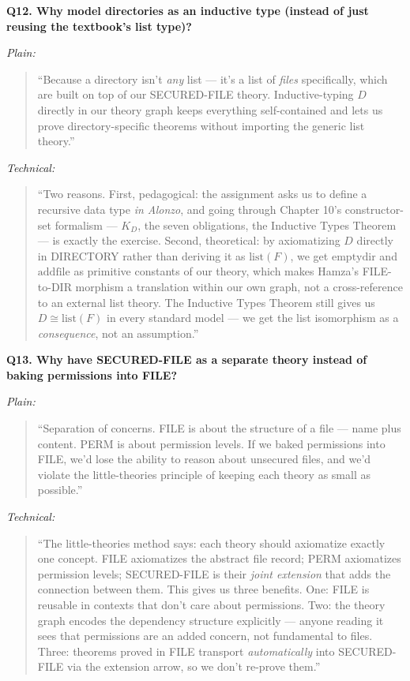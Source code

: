 \documentclass[12pt]{article}
\newenvironment{say}{%
  \par\medskip%
  \begin{quote}%
  \setlength{\parskip}{0.7em}%
  \large\itshape%
}{%
  \end{quote}%
  \medskip%
}
\begin{document}
\vspace{0.8em}
\textbf{\color{slidebar}Q12. Why model directories as an inductive type (instead of just reusing the textbook's list type)?}

\textit{\color{pauseclr}Plain:}
\begin{say}
``Because a directory isn't \emph{any} list --- it's a list of \emph{files} specifically, which are built on top of our SECURED-FILE theory. Inductive-typing $D$ directly in our theory graph keeps everything self-contained and lets us prove directory-specific theorems without importing the generic list theory.''
\end{say}

\textit{\color{pauseclr}Technical:}
\begin{say}
``Two reasons. First, pedagogical: the assignment asks us to define a recursive data type \emph{in Alonzo}, and going through Chapter 10's constructor-set formalism --- $K_D$, the seven obligations, the Inductive Types Theorem --- is exactly the exercise. Second, theoretical: by axiomatizing $D$ directly in DIRECTORY rather than deriving it as $\mathrm{list}(F)$, we get $\mathrm{emptydir}$ and $\mathrm{addfile}$ as primitive constants of our theory, which makes Hamza's FILE-to-DIR morphism a translation within our own graph, not a cross-reference to an external list theory. The Inductive Types Theorem still gives us $D \cong \mathrm{list}(F)$ in every standard model --- we get the list isomorphism as a \emph{consequence}, not an assumption.''
\end{say}

\vspace{0.8em}
\textbf{\color{slidebar}Q13. Why have SECURED-FILE as a separate theory instead of baking permissions into FILE?}

\textit{\color{pauseclr}Plain:}
\begin{say}
``Separation of concerns. FILE is about the structure of a file --- name plus content. PERM is about permission levels. If we baked permissions into FILE, we'd lose the ability to reason about unsecured files, and we'd violate the little-theories principle of keeping each theory as small as possible.''
\end{say}

\textit{\color{pauseclr}Technical:}
\begin{say}
``The little-theories method says: each theory should axiomatize exactly one concept. FILE axiomatizes the abstract file record; PERM axiomatizes permission levels; SECURED-FILE is their \emph{joint extension} that adds the connection between them. This gives us three benefits. One: FILE is reusable in contexts that don't care about permissions. Two: the theory graph encodes the dependency structure explicitly --- anyone reading it sees that permissions are an added concern, not fundamental to files. Three: theorems proved in FILE transport \emph{automatically} into SECURED-FILE via the extension arrow, so we don't re-prove them.''
\end{say}
\end{document}
